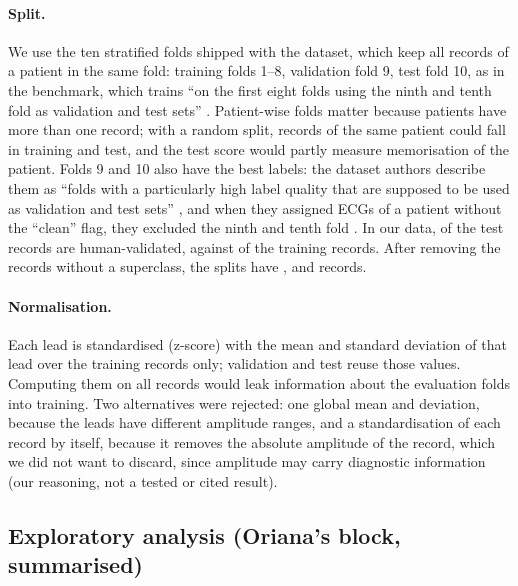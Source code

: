 \paragraph{Split.} We use the ten stratified folds shipped with the dataset, which keep all records of a
patient in the same fold: training folds 1--8, validation fold 9, test fold 10, as in the benchmark,
which trains ``on the first eight folds using the ninth and tenth fold as validation and test sets''
\cite[p.~1521]{strodthoff2021deep}. Patient-wise folds matter because \edaNPatientsSeveralRecords{} patients have
more than one record; with a random split, records of the same patient could fall in training and test,
and the test score would partly measure memorisation of the patient. Folds 9 and 10 also have the best
labels: the dataset authors describe them as ``folds with a particularly high label quality that are
supposed to be used as validation and test sets'' \cite[p.~4]{wagner2020ptbxl}, and when they assigned ECGs of
a patient without the ``clean'' flag, they excluded the ninth and tenth fold \cite[p.~12]{wagner2020ptbxl}. In
our data, \edaFracValidatedByHumanTestPct{} of the test records are human-validated, against
\edaFracValidatedByHumanTrainPct{} of the training records. After removing the records without a
superclass, the splits have \edaNLabelledTrain{}, \edaNLabelledVal{} and \edaNLabelledTest{} records.

\paragraph{Normalisation.} Each lead is standardised (z-score) with the mean and standard deviation of
that lead over the training records only; validation and test reuse those values. Computing them on all
records would leak information about the evaluation folds into training. Two alternatives were
rejected: one global mean and deviation, because the leads have different amplitude ranges, and a
standardisation of each record by itself, because it removes the absolute amplitude of the record,
which we did not want to discard, since amplitude may carry diagnostic information (our reasoning, not a
tested or cited result).



\subsection{Exploratory analysis (Oriana's block, summarised)}

